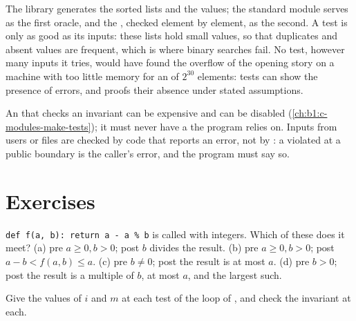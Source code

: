 \label{lst:b1:program-correctness:test}

The library  generates the sorted lists and the values; the standard module  serves as
the first oracle, and the , checked element by element, as the second. A test is only as good as its
inputs: these lists hold small values, so that duplicates and absent values are frequent, which is where binary
searches fail. No test, however many inputs it tries, would have found the overflow of the opening story on a machine
with too little memory for an  of $2^{30}$ elements: tests can show the presence of errors, and proofs their
absence under stated assumptions.

\begin{safety}
An  that checks an invariant can be expensive and can be disabled (\cref{ch:b1:c-modules-make-tests}); it
must never have a  the program relies on. Inputs from users or files are checked by code that reports an
error, not by : a violated  at a public boundary is the caller's error, and the program must
say so.
\end{safety}

\section{Exercises}\label{sec:b1:program-correctness:exercises}

\begin{exercise}[$\star$]\label{exo:b1:program-correctness:1}
\texttt{def f(a, b): return a - a \% b} is called with integers. Which of these  does it meet? (a) pre
$a \geq 0, b > 0$; post $b$ divides the result. (b) pre $a \geq 0, b > 0$; post $a - b < f(a, b) \leq a$. (c) pre $b
\neq 0$; post the result is at most $a$. (d) pre $b > 0$; post the result is a multiple of $b$, at most $a$, and the
largest such.
\end{exercise}

\begin{exercise}[$\star$]\label{exo:b1:program-correctness:2}
Give the values of $i$ and $m$ at each test of the loop of , and check the invariant at
each.
\end{exercise}


